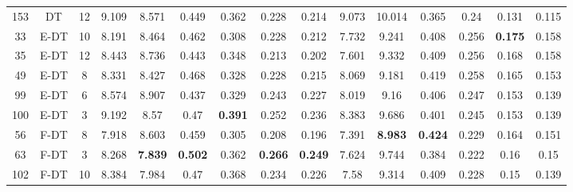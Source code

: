 \begin{table}
\begin{tabular}{@{\hskip3pt}c@{\hskip3pt}c@{\hskip3pt}c@{\hskip3pt}c@{\hskip3pt}c@{\hskip3pt}c@{\hskip3pt}c@{\hskip3pt}c@{\hskip3pt}c@{\hskip3pt}c@{\hskip3pt}c@{\hskip3pt}c@{\hskip3pt}c@{\hskip3pt}c@{\hskip3pt}c}
        153 &             DT &                  12 &             9.109 &           8.571 &           0.449 &           0.362 &           0.228 &           0.214 &               9.073 &          10.014 &           0.365 &           0.24 &           0.131 &           0.115 \\
         33 &           E-DT &                  10 &             8.191 &           8.464 &           0.462 &           0.308 &           0.228 &           0.212 &               7.732 &           9.241 &           0.408 &          0.256 &  \textbf{0.175} &           0.158 \\
         35 &           E-DT &                  12 &             8.443 &           8.736 &           0.443 &           0.348 &           0.213 &           0.202 &               7.601 &           9.332 &           0.409 &          0.256 &           0.168 &           0.158 \\
         49 &           E-DT &                   8 &             8.331 &           8.427 &           0.468 &           0.328 &           0.228 &           0.215 &               8.069 &           9.181 &           0.419 &          0.258 &           0.165 &           0.153 \\
         99 &           E-DT &                   6 &             8.574 &           8.907 &           0.437 &           0.329 &           0.243 &           0.227 &               8.019 &            9.16 &           0.406 &          0.247 &           0.153 &           0.139 \\
        100 &           E-DT &                   3 &             9.192 &            8.57 &            0.47 &  \textbf{0.391} &           0.252 &           0.236 &               8.383 &           9.686 &           0.401 &          0.245 &           0.153 &           0.139 \\
         56 &           F-DT &                   8 &             7.918 &           8.603 &           0.459 &           0.305 &           0.208 &           0.196 &               7.391 &  \textbf{8.983} &  \textbf{0.424} &          0.229 &           0.164 &           0.151 \\
         63 &           F-DT &                   3 &             8.268 &  \textbf{7.839} &  \textbf{0.502} &           0.362 &  \textbf{0.266} &  \textbf{0.249} &               7.624 &           9.744 &           0.384 &          0.222 &            0.16 &            0.15 \\
        102 &           F-DT &                  10 &             8.384 &           7.984 &            0.47 &           0.368 &           0.234 &           0.226 &                7.58 &           9.314 &           0.409 &          0.228 &            0.15 &           0.139 \\

\end{tabular}
\end{table}
